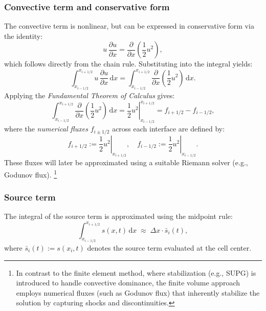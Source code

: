 \subsubsection*{Convective term and conservative form}

The convective term is nonlinear, but can be expressed in conservative form via the identity:
\begin{equation}
u \, \frac{\partial u}{\partial x} = \frac{\partial}{\partial x} \left( \frac{1}{2} u^2 \right),
\end{equation}
which follows directly from the chain rule. Substituting into the integral yields:
\begin{equation}
\int_{x_{i-1/2}}^{x_{i+1/2}} u\,\frac{\partial u}{\partial x}\,\mathrm{d}x 
= \int_{x_{i-1/2}}^{x_{i+1/2}} \frac{\partial}{\partial x} \left( \frac{1}{2} u^2 \right)\,\mathrm{d}x.
\end{equation}
Applying the \textit{Fundamental Theorem of Calculus} gives:
\begin{equation}
\int_{x_{i-1/2}}^{x_{i+1/2}} \frac{\partial}{\partial x} \left( \frac{1}{2} u^2 \right)\,\mathrm{d}x 
= \left. \frac{1}{2} u^2 \right|_{x_{i-1/2}}^{x_{i+1/2}} 
= f_{i+1/2} - f_{i-1/2},
\label{eq:fv_flux_difference}
\end{equation}
where the \textit{numerical fluxes} \( f_{i\pm1/2} \) across each interface are defined by:
\begin{equation}
f_{i+1/2} := \left. \frac{1}{2} u^2 \right|_{x_{i+1/2}}, \quad
f_{i-1/2} := \left. \frac{1}{2} u^2 \right|_{x_{i-1/2}}.
\end{equation}
These fluxes will later be approximated using a suitable Riemann solver (e.g., Godunov flux).%
\footnote{In contrast to the finite element method, where stabilization (e.g., SUPG) is introduced to handle convective dominance, the finite volume approach employs numerical fluxes (such as Godunov flux) that inherently stabilize the solution by capturing shocks and discontinuities.}

\subsubsection*{Source term}

The integral of the source term is approximated using the midpoint rule:
\begin{equation}
\int_{x_{i-1/2}}^{x_{i+1/2}} s(x,t)\,\mathrm{d}x 
\;\approx\; 
\Delta x \cdot \bar{s}_i(t),
\end{equation}
where \( \bar{s}_i(t) := s(x_i,t) \) denotes the source term evaluated at the cell center.

